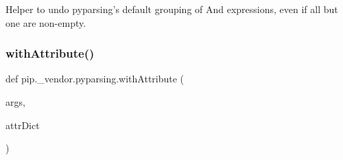 \begin{DoxyVerb}Helper to undo pyparsing's default grouping of And expressions,
even if all but one are non-empty.
\end{DoxyVerb}
 \mbox{\label{namespacepip_1_1__vendor_1_1pyparsing_a3ec3f68eb689d585377b0fa6f290d86d}} 
\subsubsection{\texorpdfstring{with\+Attribute()}{withAttribute()}}
{\footnotesize\ttfamily def pip.\+\_\+vendor.\+pyparsing.\+with\+Attribute (\begin{DoxyParamCaption}\item[{}]{args,  }\item[{}]{attr\+Dict }\end{DoxyParamCaption})}

